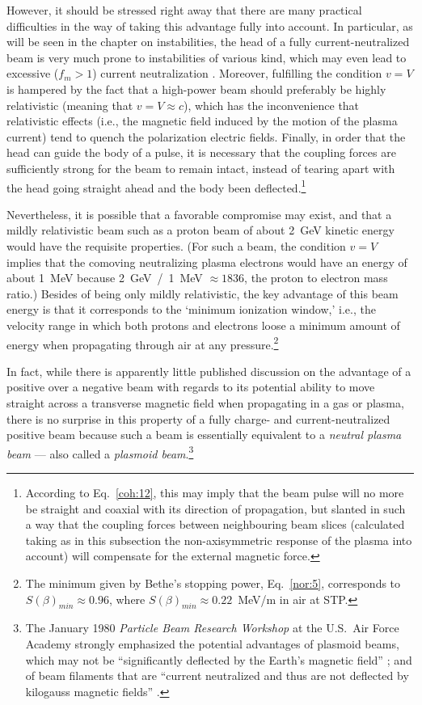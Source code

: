 \documentclass [12pt,a4paper,     ]{report} %
\begin{document}
   However, it should be stressed right away that there are many practical difficulties in the way of taking this advantage fully into account.  In particular, as will be seen in the chapter on instabilities, the head of a fully current-neutralized beam is very much prone to instabilities of various kind, which may even lead to excessive ($f_m>1$) current neutralization \cite{SUDAN1976-}.  Moreover, fulfilling the condition $v=V$ is hampered by the fact that a high-power beam should preferably be highly relativistic (meaning that $v=V \approx c$), which has the inconvenience that relativistic effects (i.e., the magnetic field induced by the motion of the plasma current) tend to quench the polarization electric fields.  Finally, in order that the head can guide the body of a pulse, it is necessary that the coupling forces are sufficiently strong for the beam to remain intact, instead of tearing apart with the head going straight ahead and the body been deflected.\footnote{According to Eq.~\eqref{coh:12}, this may imply that the beam pulse will no more be straight and coaxial with its direction of propagation, but slanted in such a way that the coupling forces between neighbouring beam slices (calculated taking as in this subsection the non-axisymmetric response of the plasma into account) will compensate for the external magnetic force.}

   Nevertheless, it is possible that a favorable compromise may exist, and that a mildly relativistic beam such as a proton beam of about 2~GeV kinetic energy would have the requisite properties. (For such a beam, the condition $v=V$ implies that the comoving neutralizing plasma electrons would have an energy of about 1~MeV because 2~GeV~/~1~MeV $\approx 1836$, the proton to electron mass ratio.)  Besides of being only mildly relativistic, the key advantage of this beam energy is that it corresponds to the `minimum ionization window,' i.e., the velocity range in which both protons and electrons loose a minimum amount of energy when propagating through air at any pressure.\footnote{The minimum given by Bethe's stopping power, Eq.~\eqref{nor:5}, corresponds to $S(\beta)_{min} \approx 0.96$, where $S(\beta)_{min} \approx 0.22$~MeV/m in air at STP.} 

   In fact, while there is apparently little published discussion on the advantage of a positive over a negative beam with regards to its potential ability to move straight across a transverse magnetic field when propagating in a gas or plasma, there is no surprise in this property of a fully charge- and current-neutralized positive beam because such a beam is essentially equivalent to a \emph{neutral plasma beam} --- also called a \emph{plasmoid beam}.\footnote{The January 1980 \emph{Particle Beam Research Workshop} at the U.S.\ Air Force Academy strongly emphasized the potential advantages of plasmoid beams, which may not be ``significantly deflected by the Earth's magnetic field'' \cite[p.58]{GUENT1980-}; and of beam filaments that are ``current neutralized and thus are not deflected by kilogauss magnetic fields''  \cite[p.73]{GUENT1980-}.} 
\end{document}
